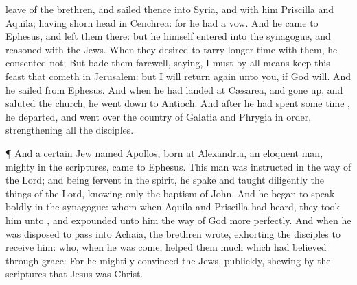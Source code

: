 {leave of the
brethren, and sailed
thence
into
Syria,
and
with
him
Priscilla
and
Aquila; having
shorn
{}
head
in
Cenchrea:
for he
had a
vow.
And he
came
to
Ephesus,
and left
them
there:
but
he
himself
entered
into the
synagogue, and
reasoned with the
Jews.
When
they
desired
{}
to
tarry
longer
time
with
them, he
consented
not;
But
bade
them
farewell,
saying,
I
must by all
means
keep this
feast that
cometh
in
Jerusalem:
but I will
return
again
unto
you,
if
God
will.
And he
sailed
from
Ephesus.
And when he had
landed
at
Cæsarea, and gone
up,
and
saluted the
church, he went
down
to
Antioch.
And after he had
spent
some
time
{}, he
departed, and went
over
{} the
country of
Galatia
and
Phrygia in
order,
strengthening
all the
disciples.
\par }{\PP {}¶
And a
certain
Jew
named
Apollos,
born at
Alexandria, an
eloquent
man,
{}
mighty
in the
scriptures,
came
to
Ephesus.
This
man
was
instructed in the
way of the
Lord;
and being
fervent in the
spirit, he
spake
and
taught
diligently the
things
of the
Lord,
knowing
only the
baptism of
John.
And
he
began to speak
boldly
in the
synagogue:
whom
when
Aquila
and
Priscilla had
heard, they
took
him
unto
{},
and
expounded unto
him the
way of
God more
perfectly.
And when
he was
disposed to
pass
into
Achaia, the
brethren
wrote,
exhorting the
disciples to
receive
him:
who, when he was
come, helped
them
much
which had
believed
through
grace:
For he
mightily
convinced the
Jews,
{}
publickly,
shewing
by the
scriptures
that
Jesus
was
Christ.

}
